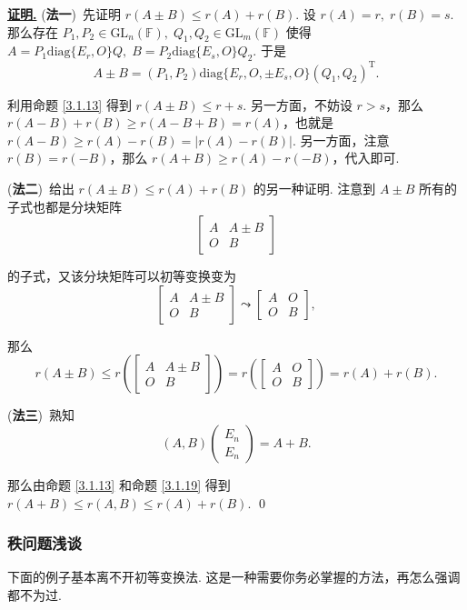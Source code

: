 \documentclass[10pt,openany]{article}
\theoremstyle{thmstyle} %
\theoremstyle{defstyle} %
\theoremstyle{prostyle} %
\theoremstyle{exastyle}
\theoremstyle{remstyle}
\renewenvironment{proof}[1][证明]{\par\underline{\textbf{#1.}} \;\fangsong}{\qed\par}
\newcommand{\T}{^{\text{T}}}
\newcommand{\gfn}{\text{GL}_n(\mathbb{F})}
\newcommand{\gfm}{\text{GL}_m(\mathbb{F})}
\newcommand{\diag}{\mathrm{diag}}
\begin{document}
\begin{proof}
	(\textbf{法一})\ 先证明 \( r(A\pm B) \leq r(A)+r(B)  \). 设 \( r(A)=r, \; r(B)=s \). 那么存在 \( P_1,P_2 \in \gfn, \; Q_1,Q_2 \in \gfm \) 使得 \( A=P_1\diag\{E_r,O\}Q, \; B=P_2\diag\{E_s,O\}Q_2 \). 于是
	\[ A \pm B= (P_1,P_2)\diag\{E_r,O,\pm E_s,O\}(Q_1,Q_2)\T. \]
	
	利用命题 \ref{3.1.13} 得到 \( r(A \pm B) \leq r+s \). 另一方面，不妨设 \( r>s \)，那么 \( r(A-B)+r(B) \geq r(A-B+B)=r(A) \)，也就是 \( r(A-B) \geq r(A)-r(B)=|r(A)-r(B)| \). 另一方面，注意 \( r(B)=r(-B) \)，那么 \( r(A+B) \geq r(A)-r(-B) \)，代入即可.
	
	(\textbf{法二})\ 给出 \( r(A\pm B) \leq r(A)+r(B)  \) 的另一种证明. 注意到 \( A \pm B \) 所有的子式也都是分块矩阵
	\[ \begin{bmatrix}
		A & A \pm B \\ O & B
	\end{bmatrix} \]
	
	的子式，又该分块矩阵可以初等变换变为
	\[ \begin{bmatrix}
		A & A \pm B \\ O & B
	\end{bmatrix} \leadsto \begin{bmatrix}
	A & O \\ O & B
	\end{bmatrix}, \]
	
	那么 
	\[ r(A\pm B) \leq r\left( \begin{bmatrix}
		A & A \pm B \\ O & B
	\end{bmatrix} \right)=r\left( \begin{bmatrix}
	A & O \\ O & B
	\end{bmatrix} \right)=r(A)+r(B). \]	 
	
	(\textbf{法三})\ 熟知
	\[ (A,B)\begin{pmatrix}
		E_n \\ E_n
	\end{pmatrix}=A+B. \]
	
	那么由命题 \ref{3.1.13} 和命题 \ref{3.1.19} 得到 \( r(A+B) \leq r(A,B) \leq r(A)+r(B) \).
\end{proof}


\subsubsection{秩问题浅谈}

下面的例子基本离不开初等变换法. 这是一种需要你务必掌握的方法，再怎么强调都不为过.
\end{document}
